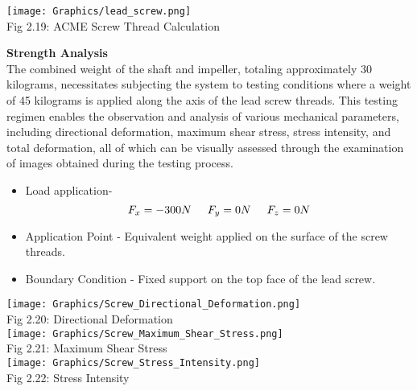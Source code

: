 \documentclass[a4,10pt]{report}
\begin{document}
\begin{enumerate}
    \begin{center}
    \texttt{[image: Graphics/lead\_screw.png]} \\
    \normalsize{Fig 2.19: ACME Screw Thread Calculation} \\ 
    \end{center}
   
   
    \textbf{Strength Analysis} \\ The combined weight of the shaft and impeller, totaling approximately 30 kilograms, necessitates subjecting the system to testing conditions where a weight of 45 kilograms is applied along the axis of the lead screw threads. This testing regimen enables the observation and analysis of various mechanical parameters, including directional deformation, maximum shear stress, stress intensity, and total deformation, all of which can be visually assessed through the examination of images obtained during the testing process.

\begin{itemize}
 \item Load application-
 \[ F_{x} = -300  N  \hspace{0.5cm} F_{y} = 0 N \hspace{0.5cm} F_{z} = 0 N \]

 \item Application Point - Equivalent weight applied on the surface of the screw threads.
 
 \item Boundary Condition - Fixed support on the top face of the lead screw.
\end{itemize}

\begin{center}
     \texttt{[image: Graphics/Screw\_Directional\_Deformation.png]} \\
     \normalsize{Fig 2.20: Directional Deformation} \\
     

     \texttt{[image: Graphics/Screw\_Maximum\_Shear\_Stress.png]} \\
     \normalsize{Fig 2.21: Maximum Shear Stress} \\
     
    
     \texttt{[image: Graphics/Screw\_Stress\_Intensity.png]} \\
     \normalsize{Fig 2.22: Stress Intensity} \\
     \vspace{5mm}
    

\end{center}
\end{enumerate}
\end{document}
